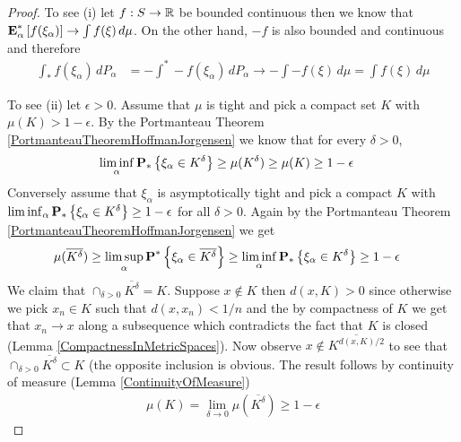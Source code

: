 \begin{proof}
To see (i) let $f : S \to \mathbb{R}$ be bounded continuous then we know that $\textbf{E}^*_{\alpha}\left [f(\xi_\alpha) \right] \to \int f(\xi) \, d\mu$.  On the other hand, $-f$ is also bounded and continuous and therefore 
\begin{align*}
\int_* f(\xi_\alpha) \, dP_\alpha &= - \int^* -f(\xi_\alpha) \, dP_\alpha \to -\int -f(\xi) \, d\mu = \int f(\xi) \, d\mu
\end{align*}

To see (ii) let $\epsilon > 0$.  Assume that $\mu$ is tight and pick a compact set $K$ with $\mu(K) > 1 - \epsilon$.  By the Portmanteau Theorem \ref{PortmanteauTheoremHoffmanJorgensen} we know that for every $\delta>0$,
\begin{align*}
\liminf_\alpha \textbf{P}_* \left \{\xi_\alpha \in K^\delta \right \} &\geq \mu(K^\delta) \geq \mu(K) \geq 1 -\epsilon
\end{align*}
Conversely assume that $\xi_\alpha$ is asymptotically tight and pick a compact $K$ with $\liminf_{\alpha} \textbf{P}_* \left \{\xi_\alpha \in K^\delta \right \} \geq 1 - \epsilon$ for all $\delta>0$.  Again by the Portmanteau Theorem \ref{PortmanteauTheoremHoffmanJorgensen} we get
\begin{align*}
\mu(\overline{K^\delta}) &\geq \limsup_\alpha \textbf{P}^* \left \{\xi_\alpha \in \overline{K^\delta} \right \} \geq \liminf_{\alpha} \textbf{P}_* \left \{\xi_\alpha \in K^\delta \right \} \geq 1 - \epsilon
\end{align*}
We claim that $\cap_{\delta > 0} \overline{K^\delta} = K$.  Suppose $x \notin K$ then $d(x,K) > 0$ since otherwise we pick $x_n \in K$ such that $d(x,x_n) < 1/n$ and the by compactness of $K$ we get that $x_n \to x$ along a subsequence which contradicts the fact that $K$ is closed (Lemma \ref{CompactnessInMetricSpaces}).  Now observe $x \notin \overline{K^{d(x,K)/2}}$ to see that $\cap_{\delta > 0} \overline{K^\delta} \subset K$ (the opposite inclusion is obvious. The result follows by continuity of measure (Lemma \ref{ContinuityOfMeasure})
\begin{align*}
\mu(K) = \lim_{\delta \to 0} \mu(\overline{K^\delta}) \geq 1-\epsilon
\end{align*}
\end{proof}


